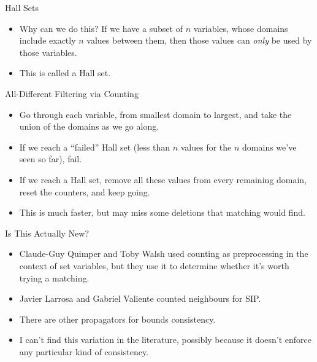 \documentclass{beamer}
\begin{document}
\begin{frame}{Hall Sets}
    \begin{itemize}
        \item Why can we do this? If we have a subset of $n$ variables, whose domains include
            exactly $n$ values between them, then those values can \emph{only} be used by those
            variables.

        \item This is called a Hall set.
    \end{itemize}
\end{frame}

\begin{frame}{All-Different Filtering via Counting}
    \begin{itemize}
        \item Go through each variable, from smallest domain to largest, and take the union of
            the domains as we go along.

        \item If we reach a ``failed'' Hall set (less than $n$ values for the $n$ domains we've
            seen so far), fail.

        \item If we reach a Hall set, remove all these values from every remaining domain, reset
            the counters, and keep going.

        \item This is much faster, but may miss some deletions that matching would find.
    \end{itemize}
\end{frame}

\begin{frame}{Is This Actually New?}
    \begin{itemize}
        \item Claude-Guy Quimper and Toby Walsh used counting as preprocessing in the context of set
            variables, but they use it to determine whether it's worth trying a matching.

        \item Javier Larrosa and Gabriel Valiente counted neighbours for SIP.

        \item There are other propagators for bounds consistency.

        \item I can't find this variation in the literature, possibly because it doesn't enforce any
            particular kind of consistency.
    \end{itemize}
\end{frame}
\end{document}
